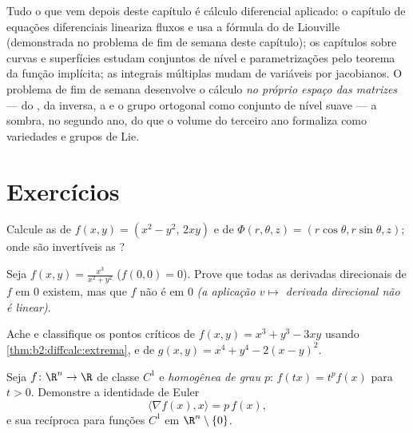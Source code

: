 \begin{remark}
Tudo o que vem depois deste capítulo é cálculo diferencial
aplicado: o capítulo de equações diferenciais lineariza fluxos e
usa a fórmula do  de Liouville (demonstrada no problema
de fim de semana deste capítulo); os capítulos sobre curvas e superfícies estudam
conjuntos de nível e parametrizações pelo teorema da função
implícita; as integrais múltiplas mudam de variáveis por jacobianos.
O problema de fim de semana desenvolve o cálculo \emph{no próprio espaço
das matrizes} ---  do , da
inversa, a  e o grupo ortogonal como conjunto de nível
suave --- a sombra, no segundo ano, do que o volume do terceiro ano
formaliza como variedades e grupos de Lie.
\end{remark}

\section{Exercícios}

\begin{exercise}[$\star$]\label{exo:b2:diffcalc:1}
Calcule as  de $f(x,y) = (x^2 - y^2,\, 2xy)$ e
de $\Phi(r,\theta,z) = (r\cos\theta, r\sin\theta, z)$; onde são
invertíveis as ?
\end{exercise}

\begin{exercise}[$\star$]\label{exo:b2:diffcalc:2}
Seja $f(x,y) = \frac{x^3}{x^2 + y^2}$ ($f(0,0) = 0$). Prove que todas as
derivadas direcionais de $f$ em $0$ existem, mas que $f$ não é
 em $0$ \emph{(a aplicação $v \mapsto$ derivada
direcional não é linear)}.
\end{exercise}

\begin{exercise}[$\star$]\label{exo:b2:diffcalc:3}
Ache e classifique os pontos críticos de $f(x, y) = x^3 + y^3 -
3xy$ usando \cref{thm:b2:diffcalc:extrema}, e de $g(x,y) = x^4 +
y^4 - 2(x - y)^2$.
\end{exercise}

\begin{exercise}[$\star\star$]\label{exo:b2:diffcalc:4}
Seja $f \colon \R^n \to \R$ de classe $C^1$ e \emph{homogênea de grau
$p$}: $f(tx) = t^pf(x)$ para $t > 0$. Demonstre a identidade de Euler
\[
\langle \nabla f(x), x\rangle = p\,f(x) ,
\]
e sua recíproca para funções $C^1$ em $\R^n\setminus\{0\}$.
\end{exercise}


